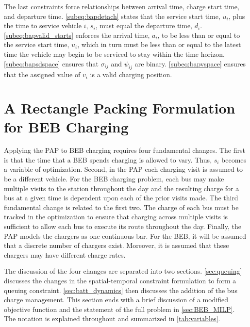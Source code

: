 \documentclass[utf8]{FrontiersinHarvard}
\begin{document}
The last constraints force relationships between arrival time, charge start time, and departure time.
\autoref{subeq:bapdetach} states that the service start time, \(u_i\), plus the time to service vehicle \(i\), \(s_i\), must
equal the departure time, \(d_i\). \autoref{subeq:bapvalid_starts} enforces the arrival time, \(a_i\), to be less than or
equal to the service start time, \(u_i\), which in turn must be less than or equal to the latest time the vehicle may
begin to be serviced to stay within the time horizon. \autoref{subeq:bapsdspace} ensures that \(\sigma_{ij}\) and
\(\psi_{ij}\) are binary. \autoref{subeq:bapvspace} ensures that the assigned value of \(v_i\) is a valid charging position.
\section{A Rectangle Packing Formulation for BEB Charging}
\label{sec:problemformulation}
Applying the PAP to BEB charging requires four fundamental changes. The first is that the time that a BEB spends
charging is allowed to vary. Thus, \(s_i\) becomes a variable of optimization. Second, in the PAP each charging visit is
assumed to be a different vehicle. For the BEB charging problem, each bus may make multiple visits to the station
throughout the day and the resulting charge for a bus at a given time is dependent upon each of the prior visits made.
The third fundamental change is related to the first two. The charge of each bus must be tracked in the optimization to
ensure that charging across multiple visits is sufficient to allow each bus to execute its route throughout the day.
Finally, the PAP models the chargers as one continuous bar. For the BEB, it will be assumed that a discrete number of
chargers exist. Moreover, it is assumed that these chargers may have different charge rates.

The discussion of the four changes are separated into two sections. \autoref{sec:queuing} discusses the changes in the
spatial-temporal constraint formulation to form a queuing constraint. \autoref{sec:batt_dynamics} then discusses the
addition of the bus charge management. This section ends with a brief discussion of a modified objective function and
the statement of the full problem in \autoref{sec:BEB_MILP}. The notation is explained throughout and summarized in
\autoref{tab:variables}.
\end{document}

